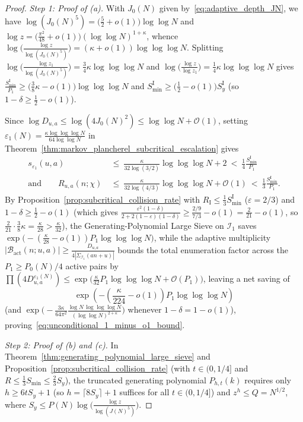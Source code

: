 \documentclass[11pt, a4paper]{article}
\theoremstyle{plain}
\theoremstyle{definition}
\begin{document}
\begin{proof}
\emph{Step 1: Proof of (a).}
With $J_0(N)$ given by~\eqref{eq:adaptive_depth_JN}, we have $\log(J_0(N)^{5})=\big(\frac52+o(1)\big)\log\log N$ and $\log z=\big(\frac{\pi^{2}}{48}+o(1)\big)(\log\log N)^{1+\kappa}$, whence $\log\big(\frac{\log z}{\log(J_0(N)^{5})}\big)=(\kappa+o(1))\log\log\log N$. Splitting $\log\big(\frac{\log z_1}{\log(J_0(N)^{5})}\big)=\frac34\kappa\log\log\log N$ and $\log\big(\frac{\log z}{\log z_1}\big)=\frac14\kappa\log\log\log N$ gives $\frac{S_{\min}^{\mathrm{I}}}{P_1}\ge\big(\frac38\kappa-o(1)\big)\log\log\log N$ and $S_{\min}^{\mathrm{I}}\ge\big(\frac12-o(1)\big)S_y^{\mathrm{I}}$ (so $1-\delta\ge\frac12-o(1)$). 

Since $\log D_{u,a}\le\log(4J_0(N)^{2})\le\log\log N+\mathcal{O}(1)$, setting $\varepsilon_1(N)=\frac{\kappa\log\log\log N}{64\log\log N}$ in Theorem~\ref{thm:markov_plancherel_subcritical_escalation} gives
\[
\begin{aligned}
s_{\varepsilon_1}(u,a)\ &\le\ \frac{\kappa}{32\log(3/2)}\log\log\log N+2\ <\ \frac14\frac{S_{\min}^{\mathrm{I}}}{P_1}\\
\text{and}\qquad R_{u,a}(n;\chi)\ &\le\ \frac{\kappa}{32\log(4/3)}\log\log\log N+\mathcal{O}(1)\ <\ \frac13\frac{S_{\min}^{\mathrm{I}}}{P_1}.
\end{aligned}
\]
By Proposition~\ref{prop:subcritical_collision_rate} with $R_{\mathrm{I}}\le\frac13 S_{\min}^{\mathrm{I}}$ ($\varepsilon=2/3$) and $1-\delta\ge\frac12-o(1)$ (which gives $\frac{\varepsilon^{2}(1-\delta)}{2+2(1-\varepsilon)(1-\delta)}\ge\frac{2/9}{7/3}-o(1)=\frac{2}{21}-o(1)$, so $\frac{2}{21}\cdot\frac38\kappa=\frac{\kappa}{28}>\frac{\kappa}{32}$), the Generating-Polynomial Large Sieve on $\mathcal{I}_1$ saves $\exp\big(-(\frac{\kappa}{28}-o(1))P_1\log\log\log N\big)$, while the adaptive multiplicity $|\mathcal{B}_{\mathrm{act}}(n;u,a)|\ge\frac{D_{u,a}}{4|\Sigma_{\mathcal{I}_1}(an+u)|}$ bounds the total enumeration factor across the $P_1\ge P_0(N)/4$ active pairs by $\prod(4D_{u,a}^{\varepsilon_1(N)})\le\allowbreak\exp\big(\frac{\kappa}{32}P_1\log\log\log N+\mathcal{O}(P_1)\big)$, leaving a net saving of 
\[
\exp\left(-\left(\frac{\kappa}{224}-o(1)\right)P_1\log\log\log N\right)
\]
(and $\exp\big(-\frac{3\kappa}{64\pi^{2}}\frac{\log N\,\log\log\log N}{(\log\log N)^{2+\kappa}}\big)$ whenever $1-\delta=\allowbreak 1-o(1)$), proving~\eqref{eq:unconditional_1_minus_o1_bound}.

\medskip\noindent\emph{Step 2: Proof of (b) and (c).}
In Theorem~\ref{thm:generating_polynomial_large_sieve} and Proposition~\ref{prop:subcritical_collision_rate} (with $t\in(0,1/4]$ and $R\le\frac13 S_{\min}\le\frac23 S_y$), the truncated generating polynomial $P_{h,t}(k)$ requires only $h\ge 6t S_y+1$ (so $h=\lceil 8 S_y\rceil+1$ suffices for all $t\in(0,1/4]$) and $z^{h}\le Q=N^{1/2}$, where $S_y\le P(N)\log\big(\frac{\log z}{\log(J(N)^{5})}\big)$. 


\end{proof}
\end{document}

